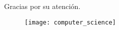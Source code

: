 \documentclass{beamer}
\begin{document}

\begin{frame}
\huge{\centerline{Gracias por su atención.}}
    \begin{figure}[H]
        \centering
        \texttt{[image: computer\_science]}
    \end{figure}
\end{frame}

\end{document}
